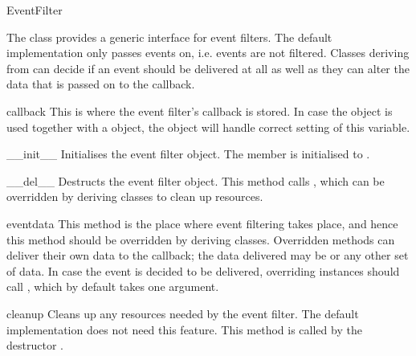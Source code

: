 \begin{classdesc*}{EventFilter}

The  class provides a generic interface for event filters.
The default implementation only passes events on, i.e. events are not filtered.
Classes deriving from  can decide if an event should be
delivered at all as well as they can alter the data that is passed on to
the callback.

\begin{memberdesc}[EventFilter]{callback}
This is where the event filter's callback is stored. In case the 
object is used together with a  object, the  object will
handle correct setting of this variable.
\end{memberdesc}

\begin{methoddesc}[EventFilter]{__init__}{}
Initialises the event filter object. The  member is initialised to
.
\end{methoddesc}

\begin{methoddesc}[EventFilter]{__del__}{}
Destructs the event filter object. This method calls ,
which can be overridden by deriving classes to clean up resources.
\end{methoddesc}

\begin{methoddesc}[EventFilter]{event}{data}
This method is the place where event filtering takes place, and hence
this method should be overridden by deriving classes. Overridden 
methods can deliver their own data to the callback; the data delivered may be
 or any other set of data.
In case the event is decided to be delivered, overriding instances should
call , which by default takes one argument.
\end{methoddesc}

\begin{methoddesc}[EventFilter]{cleanup}{}
Cleans up any resources needed by the event filter. The default implementation
does not need this feature.
This method is called by the destructor .
\end{methoddesc}

\end{classdesc*}

